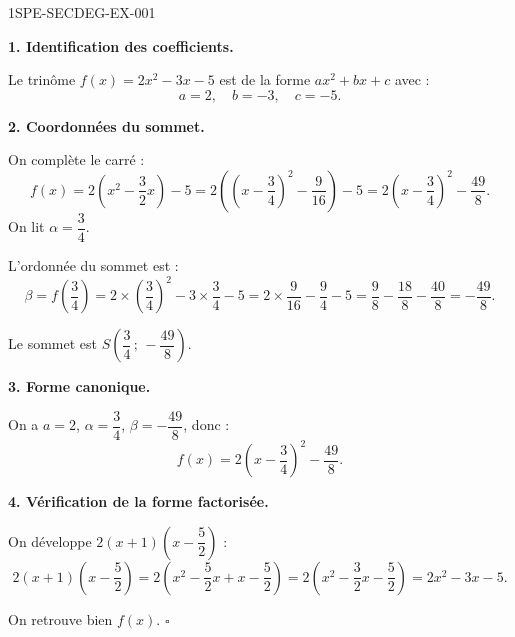 \begin{corrige}{1SPE-SECDEG-EX-001}

\textbf{1. Identification des coefficients.}


Le trinôme $f(x) = 2x^2 - 3x - 5$ est de la forme $ax^2 + bx + c$ avec :
\[a = 2, \quad b = -3, \quad c = -5.\]

\medskip
\textbf{2. Coordonnées du sommet.}


On complète le carré :
\[f(x)=2\left(x^2-\frac{3}{2}x\right)-5=2\left(\left(x-\frac{3}{4}\right)^2-\frac{9}{16}\right)-5=2\left(x-\frac{3}{4}\right)^2-\frac{49}{8}.\]
On lit $\alpha=\dfrac{3}{4}$.

L'ordonnée du sommet est :
\[\beta = f\!\left(\frac{3}{4}\right) = 2\times\left(\frac{3}{4}\right)^2 - 3\times\frac{3}{4} - 5 = 2\times\frac{9}{16} - \frac{9}{4} - 5 = \frac{9}{8} - \frac{18}{8} - \frac{40}{8} = -\frac{49}{8}.\]

Le sommet est $S\!\left(\dfrac{3}{4}\,;\,-\dfrac{49}{8}\right)$.

\medskip
\textbf{3. Forme canonique.}


On a $a = 2$, $\alpha = \dfrac{3}{4}$, $\beta = -\dfrac{49}{8}$, donc :
\[f(x) = 2\left(x - \frac{3}{4}\right)^2 - \frac{49}{8}.\]

\medskip
\textbf{4. Vérification de la forme factorisée.}


On développe $2\!\left(x+1\right)\!\left(x - \dfrac{5}{2}\right)$ :
\[2\!\left(x+1\right)\!\left(x - \frac{5}{2}\right) = 2\!\left(x^2 - \frac{5}{2}x + x - \frac{5}{2}\right) = 2\!\left(x^2 - \frac{3}{2}x - \frac{5}{2}\right) = 2x^2 - 3x - 5.\]

On retrouve bien $f(x)$. \hfill $\square$

\end{corrige}
